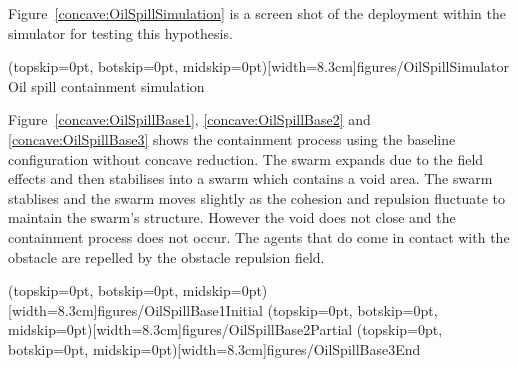 \documentclass{ieeeaccess}
\begin{document}
Figure~\ref{concave:OilSpillSimulation} is a screen shot of the deployment within the simulator for testing this hypothesis. 


\Figure[t!](topskip=0pt, botskip=0pt, midskip=0pt)[width=8.3cm]{figures/OilSpillSimulator}
{Oil spill containment simulation\label{concave:OilSpillSimulation}}

Figure~\ref{concave:OilSpillBase1}, \ref{concave:OilSpillBase2} and \ref{concave:OilSpillBase3} shows the containment process using the baseline configuration without concave reduction. The swarm expands due to the field effects and then stabilises into a swarm which contains a void area. The swarm stablises and the swarm moves slightly as the cohesion and repulsion fluctuate to maintain the swarm's structure. However the void does not close and the containment process does not occur. The agents that do come in contact with the obstacle are repelled by the obstacle repulsion field.

\Figure[t!](topskip=0pt, botskip=0pt, midskip=0pt)[width=8.3cm]{figures/OilSpillBase1}{Initial\label{concave:OilSpillBase1}}
\Figure[t!](topskip=0pt, botskip=0pt, midskip=0pt)[width=8.3cm]{figures/OilSpillBase2}{Partial\label{concave:OilSpillBase2}}
\Figure[t!](topskip=0pt, botskip=0pt, midskip=0pt)[width=8.3cm]{figures/OilSpillBase3}{End\label{concave:OilSpillBase3}}
\end{document}
